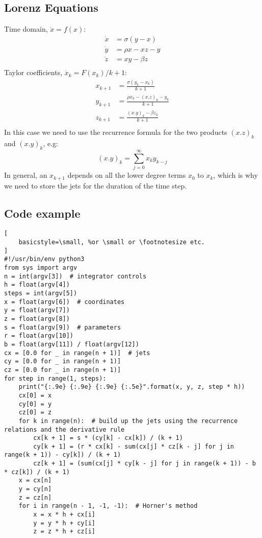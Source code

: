 \documentclass[11pt]{article}
\begin{document}
\subsection{Lorenz Equations}
Time domain, $\dot{x} = f(x)$:
\begin{equation}
\begin{aligned}
\dot{x} &= \sigma (y - x) \\
\dot{y} &= \rho x - xz - y \\
\dot{z} &= xy - \beta z \\
\end{aligned}
\end{equation}
Taylor coefficients, $\dot{x}_k = F(x_k) / k + 1$:
\begin{equation}
\begin{aligned}
x_{k+1} &= \frac{\sigma (y_k - x_k)}{k + 1} \\
y_{k+1} &= \frac{\rho x_k - (x.z)_k - y_k}{k + 1} \\
z_{k+1} &= \frac{(x.y)_k - \beta z_k}{k + 1} \\
\end{aligned}
\end{equation}
In this case we need to use the recurrence formula for the two products $(x.z)_k$ and $(x.y)_k$, e.g:
\begin{equation}
(x.y)_k = \sum_{j=0}^{\infty} x_k y_{k - j}
\end{equation}
In general, an $x_{k+1}$ depends on all the lower degree terms $x_0$ to $x_k$, which is why we need to store the jets for the duration of the time step.
\subsection{Code example}
\begin{lstlisting}[
    basicstyle=\small, %or \small or \footnotesize etc.
]
#!/usr/bin/env python3
from sys import argv
n = int(argv[3])  # integrator controls
h = float(argv[4])
steps = int(argv[5])
x = float(argv[6])  # coordinates
y = float(argv[7])
z = float(argv[8])
s = float(argv[9])  # parameters
r = float(argv[10])
b = float(argv[11]) / float(argv[12])
cx = [0.0 for _ in range(n + 1)]  # jets
cy = [0.0 for _ in range(n + 1)]
cz = [0.0 for _ in range(n + 1)]
for step in range(1, steps):
    print("{:.9e} {:.9e} {:.9e} {:.5e}".format(x, y, z, step * h))
    cx[0] = x
    cy[0] = y
    cz[0] = z
    for k in range(n):  # build up the jets using the recurrence relations and the derivative rule
        cx[k + 1] = s * (cy[k] - cx[k]) / (k + 1)
        cy[k + 1] = (r * cx[k] - sum(cx[j] * cz[k - j] for j in range(k + 1)) - cy[k]) / (k + 1)
        cz[k + 1] = (sum(cx[j] * cy[k - j] for j in range(k + 1)) - b * cz[k]) / (k + 1)
    x = cx[n]
    y = cy[n]
    z = cz[n]
    for i in range(n - 1, -1, -1):  # Horner's method
        x = x * h + cx[i]
        y = y * h + cy[i]
        z = z * h + cz[i]
\end{lstlisting}
\end{document}
